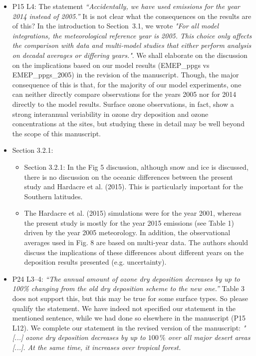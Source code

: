 \documentclass{scrartcl}
\begin{document}
\begin{itemize}
\item {\color{blue}  P15 L4: The statement \emph{“Accidentally, we have used emissions for the year
  2014 instead of 2005.”} It is not clear what the consequences on the results are of this?}
  In the introduction to Section~3.1, we wrote \emph{"For all model integrations, the meteorological reference year is 2005. This choice only affects the comparison with data and multi-model studies that either perform analysis on decadal averages or differing years."}. We shall elaborate on the discussion on the implications based on our model results (EMEP\_ppgs vs EMEP\_ppgs\_2005) in the revision of the manuscript. Though, the major consequence of this is that, for the majority of our model experiments, one can neither directly compare observations for the years 2005 nor for 2014 directly to the model results. Surface ozone observations, in fact, show a strong interannual veriability in ozone dry deposition and ozone concentrations at the sites, but studying these in detail may be well beyond the scope of this manuscript.
  \emph{}
  
\item {\color{blue}  Section 3.2.1: }
  \begin{itemize}
  \item {\color{blue}  Section 3.2.1: In the Fig 5 discussion, although snow and ice is discussed, there is
    no discussion on the oceanic differences between the present study and Hardacre et
    al. (2015). This is particularly important for the Southern latitudes.}
    \emph{}
    
  \item {\color{blue}  The Hardacre et al. (2015) simulations were for the year 2001,
    whereas the present study is mostly for the year 2015 emissions (see Table 1) driven
    by the year 2005 meteorology. In addition, the observational averages used in Fig. 8
    are based on multi-year data. The authors should discuss the implications of these
    differences about different years on the deposition results presented (e.g. uncertainty).}
    \emph{}
  \end{itemize}
  
\item {\color{blue}  P24 L3--4: \emph{“The annual amount of ozone dry deposition decreases by up
to 100\% changing from the old dry deposition scheme to the new one.”} Table 3 does
not support this, but this may be true for some surface types. So please qualify the
statement.}
  We have indeed not specified our statement in the mentioned sentence, while we had done so elsewhere in the manuscript (P15 L12). We complete our statement in the revised version of the manuscript:
  \emph{"[...] ozone dry deposition decreases by up to $100\,\%$ over all major desert areas [...]. At the same time, it increases over tropical forest.}
  

\end{itemize}
\end{document}
